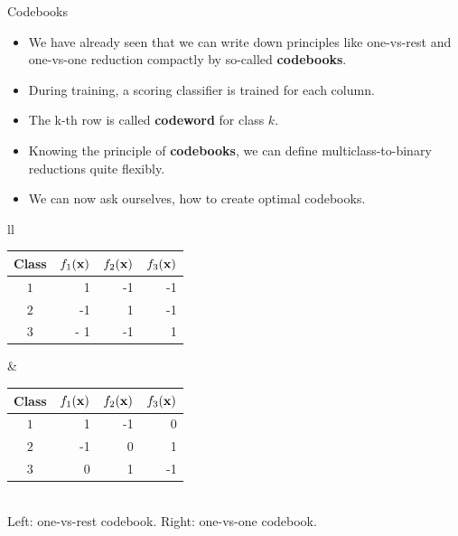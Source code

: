 \documentclass[11pt,compress,t,notes=noshow, xcolor=table]{beamer}
\begin{document}
\begin{vbframe}{Codebooks}

  \begin{itemize}
\item We have already seen that we can write down principles like one-vs-rest and one-vs-one reduction compactly by so-called \textbf{codebooks}. 
\item During training, a scoring classifier is trained for each column.
\item The k-th row is called \textbf{codeword} for class $k$.
\item Knowing the principle of \textbf{codebooks}, we can define multiclass-to-binary reductions quite flexibly.
\item We can now ask ourselves, how to create optimal codebooks.
\end{itemize}

  \begin{center}
  \begin{footnotesize}
  \begin{tabular}{ll}
    \begin{tabular}{|c|r|r|r|} \hline
    \textbf{Class}  & \textbf{$f_1{(\mathbf{x})}$} & \textbf{$f_2{(\mathbf{x})}$}  & \textbf{$f_3{(\mathbf{x})}$} \\ \hline
    \textbf{$1$}  &   1                 & -1                   & -1                   \\ \hline
    \textbf{$2$}  &  -1                 &  1                   & -1                   \\ \hline
    \textbf{$3$}  & - 1                 & -1                   &  1                   \\ \hline

    \end{tabular}
    &
    \begin{tabular}{|c|r|r|r|} \hline
    \textbf{Class}  & \textbf{$f_1{(\mathbf{x})}$} & \textbf{$f_2{(\mathbf{x})}$}  & \textbf{$f_3{(\mathbf{x})}$} \\ \hline
    \textbf{$1$}  &   1                 & -1                   & 0                  \\ \hline
    \textbf{$2$}  &  -1                 &  0                   & 1                   \\ \hline
    \textbf{$3$}  & 0                  &  1                   &  -1                   \\ \hline
    \end{tabular}
  \end{tabular} \\
  \vspace*{0.1cm}
    Left: one-vs-rest codebook. Right: one-vs-one codebook. 
  \end{footnotesize}
\end{center}



\end{vbframe}
\end{document}
